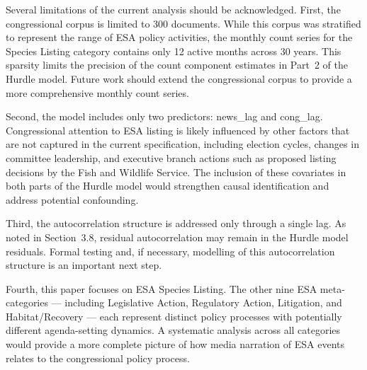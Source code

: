 \documentclass[11pt]{article}
\begin{document}
Several limitations of the current analysis should be acknowledged.
First, the congressional corpus is limited to 300 documents. While
this corpus was stratified to represent the range of ESA policy
activities, the monthly count series for the Species Listing category
contains only 12 active months across 30 years. This sparsity limits
the precision of the count component estimates in Part~2 of the Hurdle
model. Future work should extend the congressional corpus to provide
a more comprehensive monthly count series.
 
Second, the model includes only two predictors: news\_lag and
cong\_lag. Congressional attention to ESA listing is likely influenced
by other factors that are not captured in the current specification,
including election cycles, changes in committee leadership, and
executive branch actions such as proposed listing decisions by the
Fish and Wildlife Service. The inclusion of these covariates in both
parts of the Hurdle model would strengthen causal identification
and address potential confounding.
 
Third, the autocorrelation structure is addressed only through a
single lag. As noted in Section~3.8, residual autocorrelation may
remain in the Hurdle model residuals. Formal testing and, if necessary,
modelling of this autocorrelation structure is an important next step.
 
Fourth, this paper focuses on ESA Species Listing. The other nine
ESA meta-categories --- including Legislative Action, Regulatory Action,
Litigation, and Habitat/Recovery --- each represent distinct policy
processes with potentially different agenda-setting dynamics. A
systematic analysis across all categories would provide a more complete
picture of how media narration of ESA events relates to the congressional
policy process.



\end{document}
